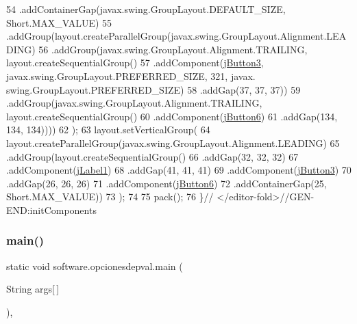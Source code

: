 \begin{DoxyCode}
54                 .addContainerGap(javax.swing.GroupLayout.DEFAULT\_SIZE, Short.MAX\_VALUE)
55                 .addGroup(layout.createParallelGroup(javax.swing.GroupLayout.Alignment.LEADING)
56                     .addGroup(javax.swing.GroupLayout.Alignment.TRAILING, layout.createSequentialGroup()
57                         .addComponent(\mbox{\hyperlink{classsoftware_1_1opcionesdepval_a402a2f2b03d2cec3d84c627cb5c3e7e1}{jButton3}}, javax.swing.GroupLayout.PREFERRED\_SIZE, 321, javax.
      swing.GroupLayout.PREFERRED\_SIZE)
58                         .addGap(37, 37, 37))
59                     .addGroup(javax.swing.GroupLayout.Alignment.TRAILING, layout.createSequentialGroup()
60                         .addComponent(\mbox{\hyperlink{classsoftware_1_1opcionesdepval_a97d4a64ac0d9874db69d6b48536e4f1b}{jButton6}})
61                         .addGap(134, 134, 134))))
62         );
63         layout.setVerticalGroup(
64             layout.createParallelGroup(javax.swing.GroupLayout.Alignment.LEADING)
65             .addGroup(layout.createSequentialGroup()
66                 .addGap(32, 32, 32)
67                 .addComponent(\mbox{\hyperlink{classsoftware_1_1opcionesdepval_ad50e625a5217f436e4271ad010531c99}{jLabel1}})
68                 .addGap(41, 41, 41)
69                 .addComponent(\mbox{\hyperlink{classsoftware_1_1opcionesdepval_a402a2f2b03d2cec3d84c627cb5c3e7e1}{jButton3}})
70                 .addGap(26, 26, 26)
71                 .addComponent(\mbox{\hyperlink{classsoftware_1_1opcionesdepval_a97d4a64ac0d9874db69d6b48536e4f1b}{jButton6}})
72                 .addContainerGap(25, Short.MAX\_VALUE))
73         );
74 
75         pack();
76     \}\textcolor{comment}{// </editor-fold>//GEN-END:initComponents}
\end{DoxyCode}
\mbox{\label{classsoftware_1_1opcionesdepval_ab3891845a5410d47021b8647ad447688}} 
\subsubsection{\texorpdfstring{main()}{main()}}
{\footnotesize\ttfamily static void software.\+opcionesdepval.\+main (\begin{DoxyParamCaption}\item[{String}]{args\mbox{[}$\,$\mbox{]} }\end{DoxyParamCaption})\hspace{0.3cm}{\ttfamily [inline]}, {\ttfamily [static]}}


